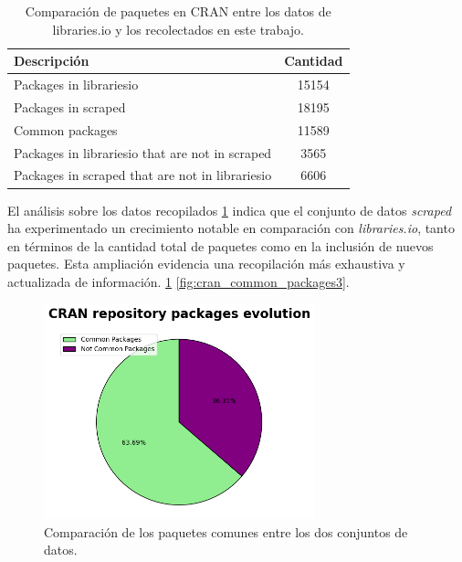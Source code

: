 \begin{table}[ht!]
    \begin{center}
        \begin{tabular}{|l|c|}
            \hline
            \textbf{Descripción}                            & \textbf{Cantidad} \\
            \hline
            Packages in librariesio                         & 15154             \\
            Packages in scraped                             & 18195             \\
            Common packages                                 & 11589             \\
            Packages in librariesio that are not in scraped & 3565              \\
            Packages in scraped that are not in librariesio & 6606              \\
            \hline
        \end{tabular}
        \caption{Comparación de paquetes en CRAN entre los datos de libraries.io y los recolectados en este trabajo.}
        \label{tab:cran_common_packages}
    \end{center}
\end{table}

El análisis sobre los datos recopilados \ref{tab:cran_common_packages} indica que el conjunto de datos \textit{scraped}
ha experimentado un crecimiento notable en comparación con \textit{libraries.io}, tanto en
términos de la cantidad total de paquetes como en la inclusión de nuevos paquetes.
Esta ampliación evidencia una recopilación más exhaustiva y actualizada de información. \ref{fig:cran_common_packages2}
\ref{fig:cran_common_packages3}.

\begin{figure}[ht!]
    \begin{center}
        \includegraphics[width=0.7\textwidth]{img/cran/circle.png}
        \caption{Comparación de los paquetes comunes entre los dos conjuntos de datos.}
        \label{fig:cran_common_packages2}
    \end{center}
\end{figure}

